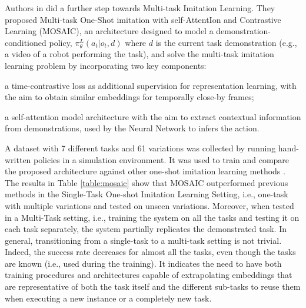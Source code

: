 Authors in \cite{mandi2022towards_more_generalizable_one_shot} did a further step towards Multi-task Imitation Learning. They proposed Multi-task One-Shot imitation with self-AttentIon and Contrastive Learning (MOSAIC), an architecture designed to model a demonstration-conditioned policy, $\pi^{L}_{\theta}(a_{t}|o_{t},d)$ where $d$ is the current task demonstration (e.g., a video of a robot performing the task), and solve the multi-task imitation learning problem by incorporating two key components: \begin{enumerate*}[label=\textbf{(\arabic*)}]
    \item a time-contrastive loss as additional supervision for representation learning, with the aim to obtain similar embeddings for temporally close-by frames;
    \item a self-attention model architecture with the aim to extract contextual information from demonstrations, used by the Neural Network to infers the action.
\end{enumerate*} A dataset with 7 different tasks and 61 variations was collected by running hand-written policies in a simulation environment. It was used to train and compare the proposed architecture against other one-shot imitation learning methods \cite{yu2018daml,dasari2021transformers_one_shot}. The results in Table \ref{table:mosaic} show that MOSAIC outperformed previous methods in the Single-Task One-shot Imitation Learning Setting, i.e., one-task with multiple variations and tested on unseen variations. Moreover, when tested in a Multi-Task setting, i.e., training the system on all the tasks and testing it on each task separately, the system partially replicates the demonstrated task. In general, transitioning from a single-task to a multi-task setting is not trivial. Indeed, the success rate decreases for almost all the tasks, even though the tasks are known (i.e., used during the training). It indicates the need to have both training procedures and architectures capable of extrapolating embeddings that are representative of both the task itself and the different sub-tasks to reuse them when executing a new instance or a completely new task.
